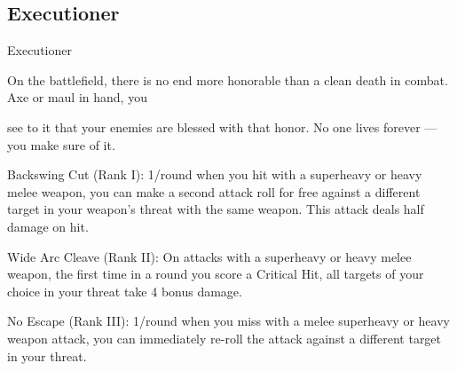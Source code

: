 \subsection{Executioner}

                                                Executioner

On the battlefield, there is no end more honorable than a clean death in combat. Axe or maul in hand, you

see to it that your enemies are blessed with that honor. No one lives forever — you make sure of it.

Backswing Cut (Rank I): 1/round when you hit with a superheavy or heavy melee weapon, you
can make a second attack roll for free against a different target in your weapon’s threat with the
same weapon. This attack deals half damage on hit.

Wide Arc Cleave (Rank II): On attacks with a superheavy or heavy melee weapon, the first time
in a round you score a Critical Hit, all targets of your choice in your threat take 4 bonus damage.

No Escape (Rank III): 1/round when you miss with a melee superheavy or heavy weapon attack,
you can immediately re-roll the attack against a different target in your threat.
